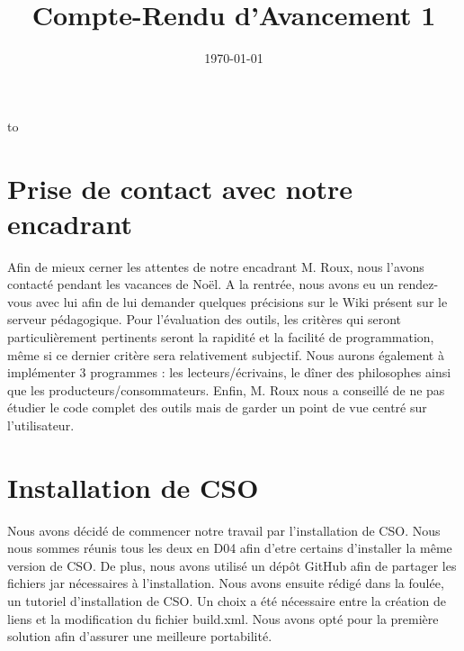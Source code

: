 \documentclass[a4paper,11pt]{article}
\date{\today}
\title{Compte-Rendu d'Avancement 1}
\makeatletter
\def\clap#1{\hbox to 0pt{\hss #1\hss}} %
\def\ligne#1{\hbox to \hsize{\vbox{\centering #1}}} %
\def\haut#1#2#3{\hbox to \hsize{\rlap{\vtop{\raggedright #1}}\hss \clap{\vtop{\centering #2}} \hss \llap{\vtop{\raggedleft #3}}}}%
\def\bas#1#2#3{\hbox to \hsize{\rlap{\vbox{\raggedright #1}} \hss \clap{\vbox{\centering #2}} \hss \llap{\vbox{\raggedleft #3}}}}%
\def\maketitle{%
	  \thispagestyle{empty}\vbox to \vsize{%
		\vspace{5mm} \ligne{\Huge \@title}
		\vspace{1cm} \haut{Supervisé par \@supervisor}{}{\@follower}
		\vspace{3mm}\hrule
		\vfill
		\bas{}{\@location, \@date}{}
		}%
	  \cleardoublepage
	  }
\makeatother
\begin{document}
\maketitle

\section{Prise de contact avec notre encadrant}

Afin de mieux cerner les attentes de notre encadrant M. Roux, nous l'avons contacté pendant les vacances de Noël. A la rentrée, nous avons eu un rendez-vous avec lui afin de lui demander quelques précisions sur le Wiki présent sur le serveur pédagogique. Pour l'évaluation des outils, les critères qui seront particulièrement pertinents seront la rapidité et la facilité de programmation, même si ce dernier critère sera relativement subjectif.
Nous aurons également à implémenter 3 programmes : les lecteurs/écrivains, le dîner des philosophes ainsi que les producteurs/consommateurs.
Enfin, M. Roux nous a conseillé de ne pas étudier le code complet des outils mais de garder un point de vue centré sur l'utilisateur.

\section{Installation de CSO}

Nous avons décidé de commencer notre travail par l'installation de CSO. Nous nous sommes réunis tous les deux en D04 afin d'etre certains d'installer la même version de CSO. De plus, nous avons utilisé un dépôt GitHub afin de partager les fichiers jar nécessaires à l'installation.
Nous avons ensuite rédigé dans la foulée, un tutoriel d'installation de CSO. Un choix a été nécessaire entre la création de liens et la modification du fichier build.xml. Nous avons opté pour la première solution afin d'assurer une meilleure portabilité.
\end{document}
